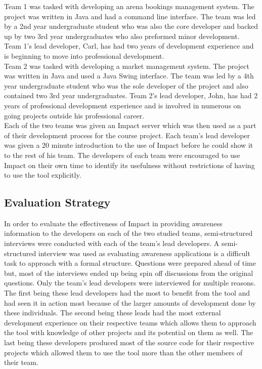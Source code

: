 \documentclass[conference]{IEEEtran}
\begin{document}
Team 1 was tasked with developing an arena bookings management system. The project was written in
Java and had a command line interface. The team was led by a 2nd year undergraduate student who was
also the core developer and backed up by two 3rd year undergraduates who also preformed minor
development. Team 1's lead developer, Carl, has had two years of development experience and is 
beginning to move into professional development.\\

Team 2 was tasked with developing a market management system. The project was written in Java
and used a Java Swing interface. The team was led by a 4th year undergraduate student who was
the sole developer of the project and also contained two 3rd year undergraduates. Team 2's lead
developer, John, has had 2 years of professional development experience and is involved in numerous
on going projects outside his professional career.\\

Each of the two teams was given an Impact server which was then used as a part of their development
process for the course project. Each team's lead developer was given a 20 minute introduction to the
use of Impact before he could show it to the rest of his team. The developers of each team were encouraged
to use Impact on their own time to identify its usefulness without restrictions of having to use
the tool explicitly.

\subsection{Evaluation Strategy}
In order to evaluate the effectiveness of Impact in providing awareness information to the developers
on each of the two studied teams, semi-structured interviews were conducted with each of the team's
lead developers. A semi-structured interview was used as evaluating awareness applications is a
difficult task to approach with a formal structure. Questions were prepared ahead of time but, most
of the interviews ended up being spin off discussions from the original questions. Only the team's
lead developers were interviewed for multiple reasons. The first being these lead developers had the
most to benefit from the tool and had seen it in action most because of the larger amounts of
development done by these individuals. The second being these leads had the most external development
experience on their respective teams which allows them to approach the tool with knowledge of
other projects and its potential on them as well. The last being these developers produced most of
the source code for their respective projects which allowed them to use the tool more than the 
other members of their team.  \\
\end{document}
